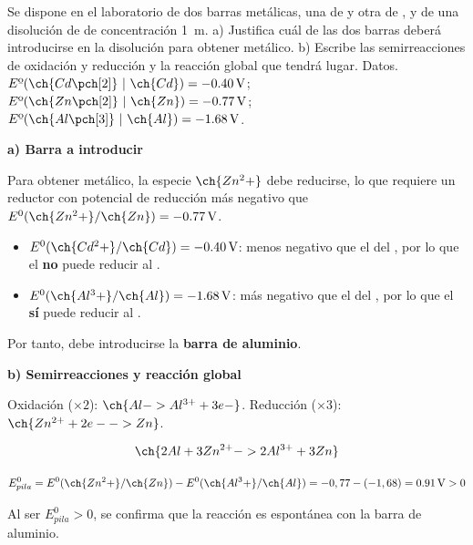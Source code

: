 \begin{exerciseEVAU}
    Se dispone en el laboratorio de dos barras metálicas, una de  y otra de , y de una disolución de  de concentración \SI{1}{\m}. a) Justifica cuál de las dos barras deberá introducirse en la disolución para obtener  metálico. b) Escribe las semirreacciones de oxidación y reducción y la reacción global que tendrá lugar. Datos. \( E\text{º}(\ch{Cd\pch[2]}\ | \ \ch{Cd}) = \SI{-0.40}{\volt} \); \( E\text{º}(\ch{Zn\pch[2]}\ | \ \ch{Zn}) = \SI{-0.77}{\volt} \); \( E\text{º}(\ch{Al\pch[3]}\ | \ \ch{Al}) = \SI{-1.68}{\volt} \).

    \begin{solu}


        \textbf{a) Barra a introducir}

        Para obtener  metálico, la especie \(\ch{Zn^2+}\) debe reducirse, lo que requiere un reductor con potencial de reducción más negativo que \(E^0(\ch{Zn^2+}/\ch{Zn}) = \SI{-0.77}{\volt}\).

        \begin{itemize}
            \item \(E^0(\ch{Cd^2+}/\ch{Cd}) = \SI{-0.40}{\volt}\): menos negativo que el del , por lo que el  \textbf{no} puede reducir al .
            \item \(E^0(\ch{Al^3+}/\ch{Al}) = \SI{-1.68}{\volt}\): más negativo que el del , por lo que el  \textbf{sí} puede reducir al .
        \end{itemize}

        Por tanto, debe introducirse la \textbf{barra de aluminio}.

        \textbf{b) Semirreacciones y reacción global}

        Oxidación (\(\times 2\)): \(\ch{Al -> Al^{3+} + 3 e-}\). Reducción (\(\times 3\)): \(\ch{Zn^{2+} + 2 e- -> Zn}\).

        \begin{equation*}
            \ch{2 Al + 3 Zn^{2+} -> 2 Al^{3+} + 3 Zn}
        \end{equation*}

        \begin{equation*}
            E^0_{pila} = E^0(\ch{Zn^2+}/\ch{Zn}) - E^0(\ch{Al^3+}/\ch{Al}) = -0,77-(-1,68) = \SI{0.91}{\volt} > 0
        \end{equation*}

        Al ser \(E^0_{pila} > 0\), se confirma que la reacción es espontánea con la barra de aluminio.

    \end{solu}
\end{exerciseEVAU}


